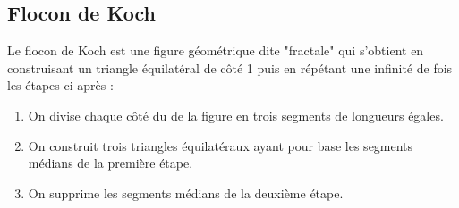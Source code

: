 \documentclass[oneside,12pt]{book}          %
\begin{document}
\subsection{Flocon de Koch}

Le flocon de Koch est une figure géométrique dite "fractale" qui s'obtient en construisant un triangle équilatéral de côté 1 puis en répétant une infinité de fois les étapes ci-après :


\begin{enumerate}
    \item On divise chaque côté du de la figure en trois segments de longueurs égales.
    \item On construit trois triangles équilatéraux ayant pour base les segments médians de la première étape.
    \item On supprime les segments médians de la deuxième étape.
\end{enumerate}
\end{document}
